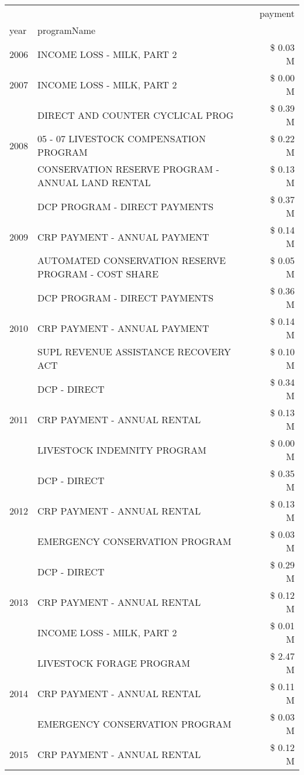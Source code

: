 \begin{tabular}{llr}
\toprule
 &  & payment \\
year & programName &  \\
\midrule
2006 & INCOME LOSS - MILK, PART 2 & \$ 0.03 M \\
\cline{1-3}
2007 & INCOME LOSS - MILK, PART 2 & \$ 0.00 M \\
\cline{1-3}
\multirow[t]{3}{*}{2008} & DIRECT AND COUNTER CYCLICAL PROG & \$ 0.39 M \\
 & 05 - 07 LIVESTOCK COMPENSATION PROGRAM & \$ 0.22 M \\
 & CONSERVATION RESERVE PROGRAM - ANNUAL LAND RENTAL & \$ 0.13 M \\
\cline{1-3}
\multirow[t]{3}{*}{2009} & DCP PROGRAM - DIRECT PAYMENTS & \$ 0.37 M \\
 & CRP PAYMENT - ANNUAL PAYMENT & \$ 0.14 M \\
 & AUTOMATED CONSERVATION RESERVE PROGRAM - COST SHARE & \$ 0.05 M \\
\cline{1-3}
\multirow[t]{3}{*}{2010} & DCP PROGRAM - DIRECT PAYMENTS & \$ 0.36 M \\
 & CRP PAYMENT - ANNUAL PAYMENT & \$ 0.14 M \\
 & SUPL REVENUE ASSISTANCE RECOVERY ACT & \$ 0.10 M \\
\cline{1-3}
\multirow[t]{3}{*}{2011} & DCP - DIRECT & \$ 0.34 M \\
 & CRP PAYMENT - ANNUAL RENTAL & \$ 0.13 M \\
 & LIVESTOCK INDEMNITY PROGRAM & \$ 0.00 M \\
\cline{1-3}
\multirow[t]{3}{*}{2012} & DCP - DIRECT & \$ 0.35 M \\
 & CRP PAYMENT - ANNUAL RENTAL & \$ 0.13 M \\
 & EMERGENCY CONSERVATION PROGRAM & \$ 0.03 M \\
\cline{1-3}
\multirow[t]{3}{*}{2013} & DCP - DIRECT & \$ 0.29 M \\
 & CRP PAYMENT - ANNUAL RENTAL & \$ 0.12 M \\
 & INCOME LOSS - MILK, PART 2 & \$ 0.01 M \\
\cline{1-3}
\multirow[t]{3}{*}{2014} & LIVESTOCK FORAGE PROGRAM & \$ 2.47 M \\
 & CRP PAYMENT - ANNUAL RENTAL & \$ 0.11 M \\
 & EMERGENCY CONSERVATION PROGRAM & \$ 0.03 M \\
\cline{1-3}
\multirow[t]{3}{*}{2015} & CRP PAYMENT - ANNUAL RENTAL & \$ 0.12 M \\

\end{tabular}
